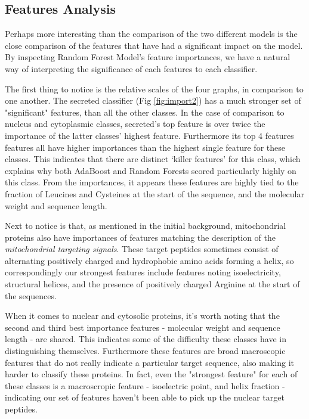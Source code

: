 \documentclass{bioinfo}
\begin{document}
\subsection{Features Analysis}

Perhaps more interesting than the comparison of the two different models is the close comparison of the features that have had a significant impact on the model.
By inspecting Random Forest Model's feature importances, we have a natural way of interpreting the significance of each features to each classifier.

The first thing to notice is the relative scales of the four graphs, in comparison to one another. The secreted classifier (Fig \ref{fig:import2}) has a much stronger set of "significant" features, than all the other classes. 
In the case of comparison to nucleus and cytoplasmic classes, secreted's top feature is over twice the importance of the latter classes' highest feature. 
Furthermore its top 4 features features all have higher importances than the highest single feature for these classes.  
This indicates that there are distinct `killer features' for this class, which explains why both AdaBoost and Random Forests scored particularly highly on this class.
From the importances, it appears these features are highly tied to the fraction of Leucines and Cysteines at the start of the sequence, and the molecular weight and sequence length.

Next to notice is that, as mentioned in the initial background, mitochondrial proteins also have importances of features matching the description of the \textit{mitochondrial targeting signals}. 
These target peptides sometimes consist of alternating positively charged and hydrophobic amino acids forming a helix, so correspondingly our strongest features include features noting isoelectricity, structural helices, and the presence of positively charged Arginine at the start of the sequences.

When it comes to nuclear and cytosolic proteins, it's worth noting that the second and third best importance features - molecular weight and sequence length - are shared. 
This indicates some of the difficulty these classes have in distinguishing themselves.  
Furthermore these features are broad macroscopic features that do not really indicate a particular target sequence, also making it harder to classify these proteins. 
In fact, even the "strongest feature" for each of these classes is a macroscropic feature - isoelectric point, and helix fraction - indicating our set of features haven't been able to pick up the nuclear target peptides.
\end{document}
